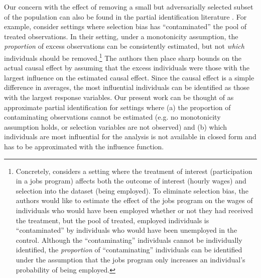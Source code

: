 Our concern with the effect of removing a small but adversarially selected
subset of the population can also be found in the partial identification
literature \citep{manski:2003:partial}.  For example, 
\citet{lee:2005:partialidentification,semenova:2020:generalizedleebounds}
consider settings where selection bias has ``contaminated'' the pool of treated
observations. In their setting, under a monotonicity assumption, the {\em
proportion} of excess observations can be consistently estimated, but not {\em
which} individuals should be removed.\footnote{Concretely,
\citet{lee:2005:partialidentification} considers a setting where the treatment
of interest (participation in a jobs program) affects both the outcome of
interest (hourly wages) and selection into the dataset (being employed).  To
eliminate selection bias, the authors would like to estimate the effect of the
jobs program on the wages of individuals who would have been employed whether or
not they had received the treatment, but the pool of treated, employed
individuals is ``contaminated'' by individuals who would have been unemployed
in the control. Although the ``contaminating'' individuals cannot be
individually identified, the {\em proportion} of ``contaminating'' individuals
can be identified under the assumption that the jobs program only increases an
individual's probability of being employed.} The authors then place sharp bounds
on the actual causal effect by assuming that the excess individuals were those
with the largest influence on the estimated causal effect.  Since the causal
effect is a simple difference in averages, the most influential individuals can
be identified as those with the largest response variables.  Our present work
can be thought of as approximate partial identification for settings where (a)
the proportion of contaminating observations cannot be estimated (e.g. no
monotonicity assumption holds, or selection variables are not observed) and (b)
which individuals are most influential for the analysis is not available in
closed form and has to be approximated with the influence function.

